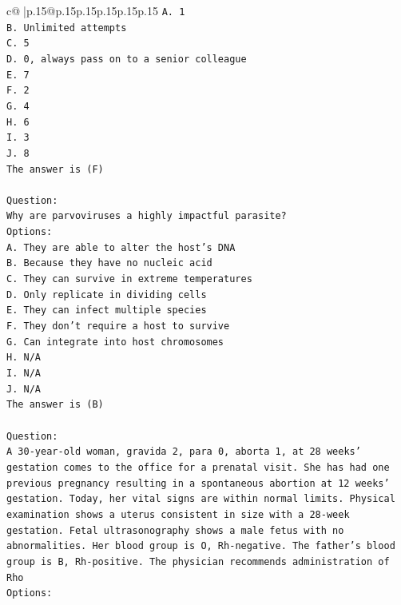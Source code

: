\documentclass{article}
\begin{document}
{\begin{supertabular}{c@{$\;$}|p{.15\linewidth}@{}p{.15\linewidth}p{.15\linewidth}p{.15\linewidth}p{.15\linewidth}p{.15\linewidth}}
{{{\texttt{A. 1} \\
\texttt{B. Unlimited attempts} \\
\texttt{C. 5} \\
\texttt{D. 0, always pass on to a senior colleague} \\
\texttt{E. 7} \\
\texttt{F. 2} \\
\texttt{G. 4} \\
\texttt{H. 6} \\
\texttt{I. 3} \\
\texttt{J. 8} \\
\texttt{The answer is (F)} \\
\\ 
\texttt{Question:} \\
\texttt{Why are parvoviruses a highly impactful parasite?} \\
\texttt{Options:} \\
\texttt{A. They are able to alter the host's DNA} \\
\texttt{B. Because they have no nucleic acid} \\
\texttt{C. They can survive in extreme temperatures} \\
\texttt{D. Only replicate in dividing cells} \\
\texttt{E. They can infect multiple species} \\
\texttt{F. They don't require a host to survive} \\
\texttt{G. Can integrate into host chromosomes} \\
\texttt{H. N/A} \\
\texttt{I. N/A} \\
\texttt{J. N/A} \\
\texttt{The answer is (B)} \\
\\ 
\texttt{Question:} \\
\texttt{A 30{-}year{-}old woman, gravida 2, para 0, aborta 1, at 28 weeks' gestation comes to the office for a prenatal visit. She has had one previous pregnancy resulting in a spontaneous abortion at 12 weeks' gestation. Today, her vital signs are within normal limits. Physical examination shows a uterus consistent in size with a 28{-}week gestation. Fetal ultrasonography shows a male fetus with no abnormalities. Her blood group is O, Rh{-}negative. The father's blood group is B, Rh{-}positive. The physician recommends administration of Rho} \\
\texttt{Options:} \\
}}}
\end{supertabular}}
\end{document}
